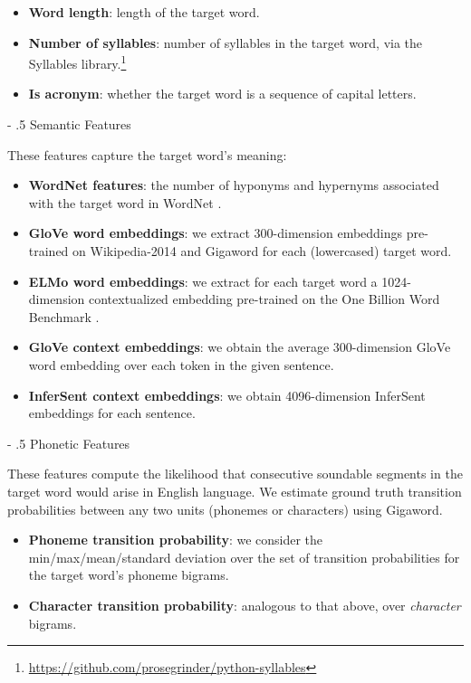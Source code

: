 \documentclass[11pt,a4paper]{article}
\makeatletter
\renewcommand\paragraph{%
    \@startsection{paragraph}{4}{0mm}%
        {-\baselineskip}%
        {.5\baselineskip}%
        {\normalfont\normalsize\bfseries}}
\makeatother
\begin{document}
\begin{itemize}
  \item \textbf{Word length}: length of the target word.
  \item \textbf{Number of syllables}: number of syllables in the target word, via the Syllables library.\footnote{\url{https://github.com/prosegrinder/python-syllables}}
  \item \textbf{Is acronym}: whether the target word is a sequence of capital letters.
\end{itemize}
  
\paragraph{Semantic Features}

These features capture the target word's meaning:

\begin{itemize}
  \item \textbf{WordNet features}: the number of hyponyms and hypernyms associated with the target word in WordNet \citep{Fellbaum:2005}.
  \item \textbf{GloVe word embeddings}: we extract 300-dimension embeddings pre-trained on Wikipedia-2014 and Gigaword \citep{pennington2014glove} for each (lowercased) target word. 
  \item \textbf{ELMo word embeddings}: we extract for each target word a 1024-dimension contextualized embedding pre-trained on the One Billion Word Benchmark \citep{Peters:2018}.
  \item \textbf{GloVe context embeddings}: we obtain the average 300-dimension GloVe word embedding over each token in the given sentence.
  \item \textbf{InferSent context embeddings}: we obtain 4096-dimension InferSent embeddings \citep{conneau-EtAl:2017:EMNLP2017} for each sentence.
\end{itemize}

\paragraph{Phonetic Features}

These features compute the likelihood that consecutive soundable segments in the target word would arise in English language. We estimate ground truth transition probabilities between any two units (phonemes or characters) using Gigaword. 

\begin{itemize}
  \item \textbf{Phoneme transition probability}: we consider the min/max/mean/standard deviation over the set of transition probabilities for the target word's phoneme bigrams.
  \item \textbf{Character transition probability}: analogous to that above, over \textit{character} bigrams.
\end{itemize}
\end{document}

